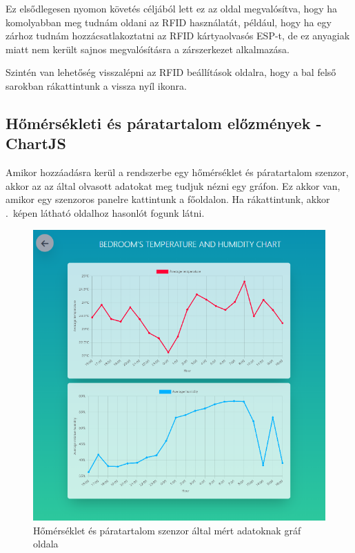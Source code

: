 \documentclass[
]{thesis-ekf}
\theoremstyle{definition}
\theoremstyle{remark}
\begin{document}
	Ez elsődlegesen nyomon követés céljából lett ez az oldal megvalósítva, hogy ha komolyabban meg tudnám oldani az RFID használatát, például, hogy ha egy zárhoz tudnám hozzácsatlakoztatni az RFID kártyaolvasós ESP-t, de ez anyagiak miatt nem került sajnos megvalósításra a zárszerkezet alkalmazása.
	
	Szintén van lehetőség visszalépni az RFID beállítások oldalra, hogy a bal felső sarokban rákattintunk a vissza nyíl ikonra.
	\subsection{Hőmérsékleti és páratartalom előzmények - ChartJS}
	
	Amikor hozzáadásra kerül a rendszerbe egy hőmérséklet és páratartalom szenzor, akkor az az által olvasott adatokat meg tudjuk nézni egy gráfon. Ez akkor van, amikor egy szenzoros panelre kattintunk a főoldalon. Ha rákattintunk, akkor .~képen látható oldalhoz hasonlót fogunk látni.
	
	\begin{figure}[ht!]
		\centering
		\includegraphics[width=1\textwidth]{./src/pages_img/humidity-chart}
		\caption{Hőmérséklet és páratartalom szenzor által mért adatoknak gráf oldala}
		\label{temp-hum-chart}
	\end{figure}
\end{document}
